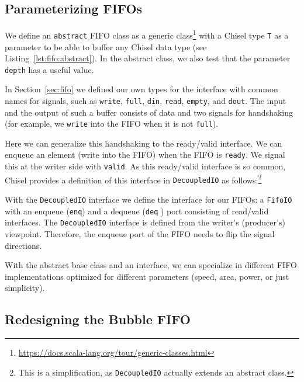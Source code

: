 \documentclass[%
    10pt,
    headinclude, footexclude,
    openright, %
    notitlepage,
    cleardoubleempty,
    headsepline,
    pointlessnumbers,
    bibtotoc, idxtotoc,
    ]{scrbook}
\newcommand{\code}[1]{{\lstinline[basicstyle=\small\ttfamily]{#1}}}
\newcommand{\codefoot}[1]{{\lstinline[basicstyle=\footnotesize\ttfamily]{#1}}}
\newcommand{\myref}[2]{\href{#1}{#2}}
\renewcommand{\myref}[2]{{#2}{\footnote{\url{#1}}}}
\begin{document}
\subsection{Parameterizing FIFOs}

We define an \code{abstract}
FIFO class as a \myref{https://docs.scala-lang.org/tour/generic-classes.html}{generic class}
with a Chisel type \code{T} as a parameter to be able to buffer
any Chisel data type (see Listing~\ref{lst:fifo:abstract}). In the abstract class, we also test that the
parameter \code{depth} has a useful value.


In Section~\ref{sec:fifo} we defined our own types for the interface with common
names for signals, such as \code{write}, \code{full}, \code{din}, \code{read},
\code{empty}, and \code{dout}. The input and the output of such a buffer consists
of data and two signals for handshaking (for example, we \code{write} into the FIFO when
it is not \code{full}).

Here we can generalize this handshaking to the ready/valid interface.
We can enqueue an element (write into the FIFO) when the FIFO is \code{ready}.
We signal this at the writer side with \code{valid}.
As this ready/valid interface is so common, Chisel provides a definition
of this interface in \code{DecoupledIO} as follows:\footnote{This is a simplification,
as \codefoot{DecoupledIO} actually extends an abstract class.}


\noindent With the \code{DecoupledIO} interface we define the interface for our FIFOs:
a \code{FifoIO} with an enqueue (\code{enq}) and a dequeue (\code{deq} ) port consisting
of read/valid interfaces.
 The \code{DecoupledIO} interface is defined from the writer's (producer's) viewpoint.
Therefore, the enqueue port of the FIFO needs to flip the signal directions.



With the abstract base class and an interface, we can specialize in different
FIFO implementations optimized for different parameters (speed, area, power,
or just simplicity).

\subsection{Redesigning the Bubble FIFO}
\end{document}
